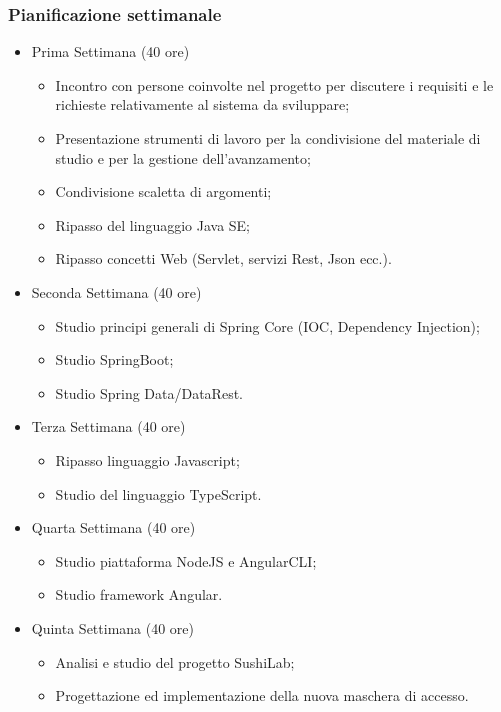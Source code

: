 \subsubsection*{Pianificazione settimanale}
\begin{itemize}
    \item Prima Settimana (40 ore)
    \begin{itemize}
        \item Incontro con persone coinvolte nel progetto per discutere i requisiti e le richieste relativamente
        al sistema da sviluppare;
        \item Presentazione strumenti di lavoro per la condivisione del materiale di studio e per la gestione
        dell'avanzamento;
        \item Condivisione scaletta di argomenti;
        \item Ripasso del linguaggio Java SE;
        \item Ripasso concetti Web (Servlet, servizi Rest, Json ecc.).
    \end{itemize}
    \item Seconda Settimana (40 ore)
        \begin{itemize}
            \item Studio principi generali di Spring Core (IOC, Dependency Injection);
            \item Studio SpringBoot;
            \item Studio Spring Data/DataRest.
        \end{itemize}
    \item Terza Settimana (40 ore)
        \begin{itemize}
            \item Ripasso linguaggio Javascript;
            \item Studio del linguaggio TypeScript.
        \end{itemize}
    \item Quarta Settimana (40 ore)
        \begin{itemize}
            \item Studio piattaforma NodeJS e AngularCLI;
            \item Studio framework Angular.
        \end{itemize}
    \item Quinta Settimana (40 ore)
        \begin{itemize}
        \item Analisi e studio del progetto SushiLab;
        \item Progettazione ed implementazione della nuova maschera di accesso.

\end{itemize}
\end{itemize}
